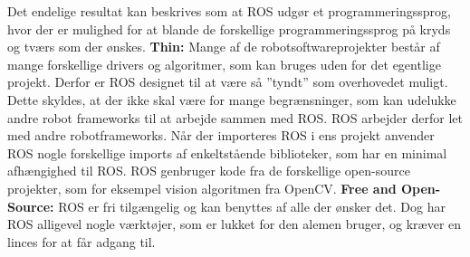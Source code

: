 Det endelige resultat kan beskrives som at ROS udgør et programmeringssprog, hvor der er mulighed for at blande de forskellige programmeringssprog på kryds og tværs som der ønskes. \newline
\newline
\textbf{Thin:} Mange af de robotsoftwareprojekter består af mange forskellige drivers og algoritmer, som kan bruges uden for det egentlige projekt. Derfor er ROS designet til at være så ”tyndt” som overhovedet muligt. Dette skyldes, at der ikke skal være for mange begrænsninger, som kan udelukke andre robot frameworks til at arbejde sammen med ROS. ROS arbejder derfor let med andre robotframeworks. Når der importeres ROS i ens projekt anvender ROS nogle forskellige imports af enkeltstående biblioteker, som har en minimal afhængighed til ROS. ROS genbruger kode fra de forskellige open-source projekter, som for eksempel vision algoritmen fra OpenCV.\newline
\newline
\textbf{Free and Open-Source: }ROS er fri tilgængelig og kan benyttes af alle der ønsker det. Dog har ROS alligevel nogle værktøjer, som er lukket for den alemen bruger, og kræver en linces for at får adgang til.
